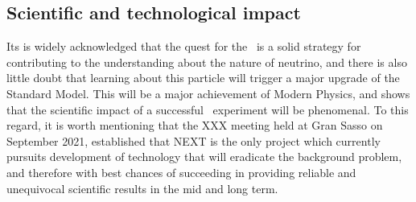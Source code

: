 







\subsection{Scientific and technological impact}

Its is  widely acknowledged that the quest for the \bbonu\ is a solid strategy for contributing to the understanding about the nature of neutrino, and there is also little doubt that learning about this particle will trigger a major upgrade of the Standard Model. This will be  a major achievement of Modern Physics, and shows that the scientific impact of a successful \bbonu\ experiment will  be phenomenal. To this regard, it is worth mentioning that the XXX meeting held at Gran Sasso on September 2021, established that NEXT is the only project which currently pursuits development of technology that will eradicate the background problem, and therefore with best chances of succeeding in providing reliable and unequivocal scientific results in the mid and long term. 

